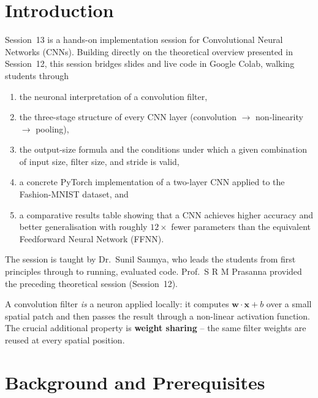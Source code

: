 \documentclass[12pt,a4paper]{article}
\begin{document}
\section{Introduction}
\label{sec:introduction}

Session~13 is a hands-on implementation session for Convolutional Neural
Networks (CNNs).  Building directly on the theoretical overview presented in
Session~12, this session bridges slides and live code in Google Colab,
walking students through

\begin{enumerate}[label=\arabic*.]
  \item the neuronal interpretation of a convolution filter,
  \item the three-stage structure of every CNN layer
        (convolution $\to$ non-linearity $\to$ pooling),
  \item the output-size formula and the conditions under which a given
        combination of input size, filter size, and stride is valid,
  \item a concrete PyTorch implementation of a two-layer CNN applied to the
        Fashion-MNIST dataset, and
  \item a comparative results table showing that a CNN achieves higher
        accuracy and better generalisation with roughly $12\times$ fewer
        parameters than the equivalent Feedforward Neural Network (FFNN).
\end{enumerate}

The session is taught by Dr.\ Sunil Saumya, who leads the students from first
principles through to running, evaluated code.  Prof.\ S R M Prasanna
provided the preceding theoretical session (Session~12).

\begin{keyinsight}
A convolution filter \emph{is} a neuron applied locally: it computes
$\mathbf{w}\cdot\mathbf{x}+b$ over a small spatial patch and then passes the
result through a non-linear activation function.  The crucial additional
property is \textbf{weight sharing} -- the same filter weights are reused at
every spatial position.
\end{keyinsight}

\section{Background and Prerequisites}
\label{sec:background}
\end{document}
